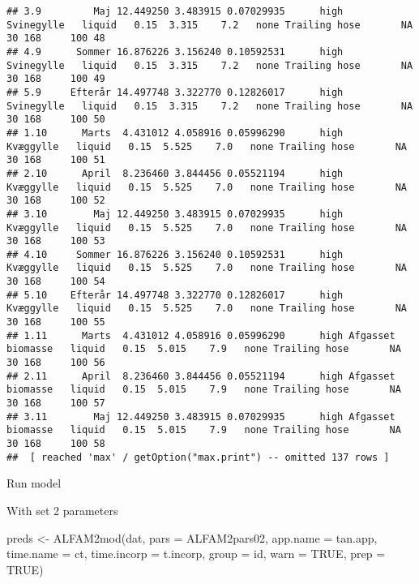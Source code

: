 \documentclass[
  landscape]{article}
\newenvironment{Shaded}{\begin{snugshade}}{\end{snugshade}}
\newcommand{\AttributeTok}[1]{\textcolor[rgb]{0.77,0.63,0.00}{#1}}
\newcommand{\ConstantTok}[1]{\textcolor[rgb]{0.00,0.00,0.00}{#1}}
\newcommand{\FunctionTok}[1]{\textcolor[rgb]{0.00,0.00,0.00}{#1}}
\newcommand{\NormalTok}[1]{#1}
\newcommand{\OtherTok}[1]{\textcolor[rgb]{0.56,0.35,0.01}{#1}}
\newcommand{\StringTok}[1]{\textcolor[rgb]{0.31,0.60,0.02}{#1}}
\begin{document}
\begin{verbatim}
## 3.9         Maj 12.449250 3.483915 0.07029935      high        Svinegylle   liquid   0.15  3.315    7.2   none Trailing hose       NA          30 168     100 48
## 4.9      Sommer 16.876226 3.156240 0.10592531      high        Svinegylle   liquid   0.15  3.315    7.2   none Trailing hose       NA          30 168     100 49
## 5.9     Efterår 14.497748 3.322770 0.12826017      high        Svinegylle   liquid   0.15  3.315    7.2   none Trailing hose       NA          30 168     100 50
## 1.10      Marts  4.431012 4.058916 0.05996290      high         Kvæggylle   liquid   0.15  5.525    7.0   none Trailing hose       NA          30 168     100 51
## 2.10      April  8.236460 3.844456 0.05521194      high         Kvæggylle   liquid   0.15  5.525    7.0   none Trailing hose       NA          30 168     100 52
## 3.10        Maj 12.449250 3.483915 0.07029935      high         Kvæggylle   liquid   0.15  5.525    7.0   none Trailing hose       NA          30 168     100 53
## 4.10     Sommer 16.876226 3.156240 0.10592531      high         Kvæggylle   liquid   0.15  5.525    7.0   none Trailing hose       NA          30 168     100 54
## 5.10    Efterår 14.497748 3.322770 0.12826017      high         Kvæggylle   liquid   0.15  5.525    7.0   none Trailing hose       NA          30 168     100 55
## 1.11      Marts  4.431012 4.058916 0.05996290      high Afgasset biomasse   liquid   0.15  5.015    7.9   none Trailing hose       NA          30 168     100 56
## 2.11      April  8.236460 3.844456 0.05521194      high Afgasset biomasse   liquid   0.15  5.015    7.9   none Trailing hose       NA          30 168     100 57
## 3.11        Maj 12.449250 3.483915 0.07029935      high Afgasset biomasse   liquid   0.15  5.015    7.9   none Trailing hose       NA          30 168     100 58
##  [ reached 'max' / getOption("max.print") -- omitted 137 rows ]
\end{verbatim}

Run model

With set 2 parameters

\begin{Shaded}
\begin{Highlighting}[]
\NormalTok{preds }\OtherTok{\textless{}{-}} \FunctionTok{ALFAM2mod}\NormalTok{(dat, }\AttributeTok{pars =}\NormalTok{ ALFAM2pars02, }\AttributeTok{app.name =} \StringTok{\textquotesingle{}tan.app\textquotesingle{}}\NormalTok{, }\AttributeTok{time.name =} \StringTok{\textquotesingle{}ct\textquotesingle{}}\NormalTok{, }
                   \AttributeTok{time.incorp =} \StringTok{\textquotesingle{}t.incorp\textquotesingle{}}\NormalTok{, }\AttributeTok{group =} \StringTok{\textquotesingle{}id\textquotesingle{}}\NormalTok{, }\AttributeTok{warn =} \ConstantTok{TRUE}\NormalTok{, }\AttributeTok{prep =} \ConstantTok{TRUE}\NormalTok{)}
\end{Highlighting}
\end{Shaded}
\end{document}
